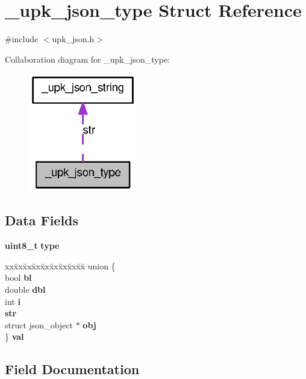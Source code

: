 \section{\_\-upk\_\-json\_\-type Struct Reference}
\label{struct__upk__json__type}


{\ttfamily \#include $<$upk\_\-json.h$>$}



Collaboration diagram for \_\-upk\_\-json\_\-type:\nopagebreak
\begin{figure}[H]
\begin{center}
\leavevmode
\includegraphics[width=134pt]{struct__upk__json__type__coll__graph}
\end{center}
\end{figure}
\subsection*{Data Fields}
\begin{DoxyCompactItemize}
\item 
{\bf uint8\_\-t} {\bf type}
\item 
\begin{tabbing}
xx\=xx\=xx\=xx\=xx\=xx\=xx\=xx\=xx\=\kill
union \{\\
\>bool {\bf bl}\\
\>double {\bf dbl}\\
\>int {\bf i}\\
 {\bf str}\\
\>struct json\_object $\ast$ {\bf obj}\\
\} {\bf val}\\

\end{tabbing}\end{DoxyCompactItemize}


\subsection{Field Documentation}
